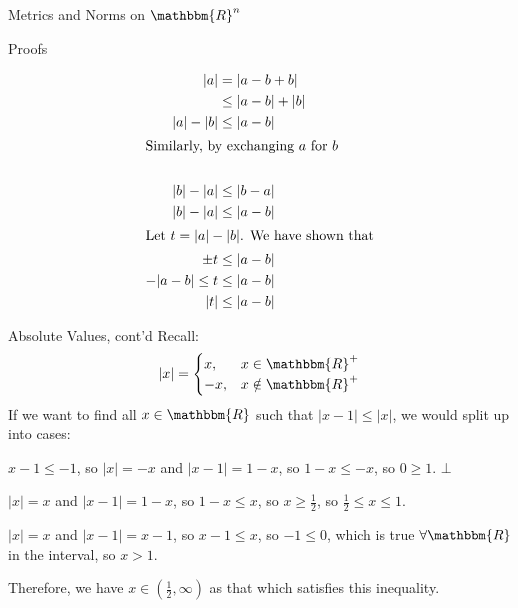 \documentclass[10pt]{extarticle}
\newcommand{\R}{\mathbbm{R}}
\begin{document}
\begin{problem}{Metrics and Norms on $\R^n$}
\begin{problem}{Proofs}
\begin{description}[font=\normalfont]
          \begin{align*}
            |a| &= |a-b+b| \\
                &\leq |a-b| + |b| \\
            |a| - |b| &\leq |a-b|\\
            \shortintertext{Similarly, by exchanging $a$ for $b$}\\
            |b| - |a| &\leq |b-a|\\
            |b| - |a| &\leq |a-b|\\
            \shortintertext{Let $t = |a| - |b|$. We have shown that}
            \pm t &\leq |a-b|\\
            -|a-b| \leq t &\leq |a-b|\\
            |t| &\leq |a-b|
          \end{align*}
      \end{description}
    \end{problem}
  \end{problem}
  \begin{problem}{Absolute Values, cont'd}
    Recall:
    \[
      |x| = \begin{cases}
        x,&x\in\R^+\\
        -x,&x\notin \R^+
      \end{cases}
    \] 
    If we want to find all $x\in\R$ such that $|x-1| \leq |x|$, we would split up into cases:
    \begin{description}[font=\normalfont]
      \item[$x\leq 0$] $x-1 \leq -1$, so $|x| = -x$ and $|x-1| = 1-x$, so $1-x \leq -x$, so $0 \geq 1$. $\bot$
      \item[$0 < x \leq 1$] $|x| = x$ and $|x-1| = 1-x$, so $1-x \leq x$, so $x \geq \frac{1}{2}$, so $\frac{1}{2} \leq x \leq 1$.
      \item[$1 < x$] $|x| = x$ and $|x-1| = x-1$, so $x-1 \leq x$, so $-1 \leq 0$, which is true $\forall \R$ in the interval, so $x > 1$.
    \end{description}
    Therefore, we have $x\in \left(\frac{1}{2},\infty\right)$ as that which satisfies this inequality.
  \end{problem}
\end{document}
